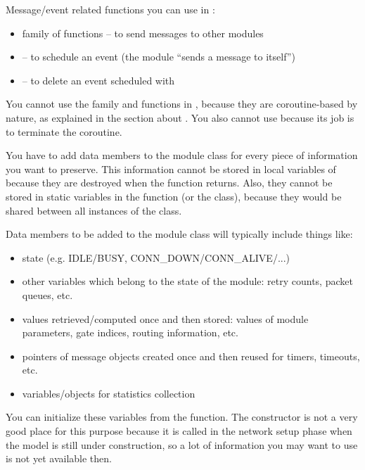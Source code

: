 Message/event related functions you can use in :
\begin{itemize}
\item{ family of functions -- to send messages to other modules}
\item{ -- to schedule an event (the module ``sends
a message to itself'')}
\item{ -- to delete an event scheduled with }
\end{itemize}

You cannot use the  family and
 functions in , because they are
coroutine-based by nature, as explained in the section about
. You also cannot use  because its job
is to terminate the coroutine.


You have to add data members to the module class for every piece
of information you want to preserve. This information cannot
be stored in local variables of  because they
are destroyed when the function returns. Also, they cannot be
stored in static variables in the function (or the class), because
they would be shared between all instances of the class.


Data members to be added to the module class will typically include
things like:
\begin{itemize}
\item{state (e.g. IDLE/BUSY, CONN\_DOWN/CONN\_ALIVE/...)}
\item{other variables which belong to the state of the module: retry
    counts, packet queues, etc.}
\item{values retrieved/computed once and then stored: values of module
    parameters, gate indices, routing information, etc.}
\item{pointers of message objects created once and then reused for
    timers, timeouts, etc.}
\item{variables/objects for statistics collection}
\end{itemize}

You can initialize these variables from the 
function.  The constructor is not a very good place
for this purpose because it is called in the network setup phase when
the model is still under construction, so a lot of information you may
want to use is not yet available then.


